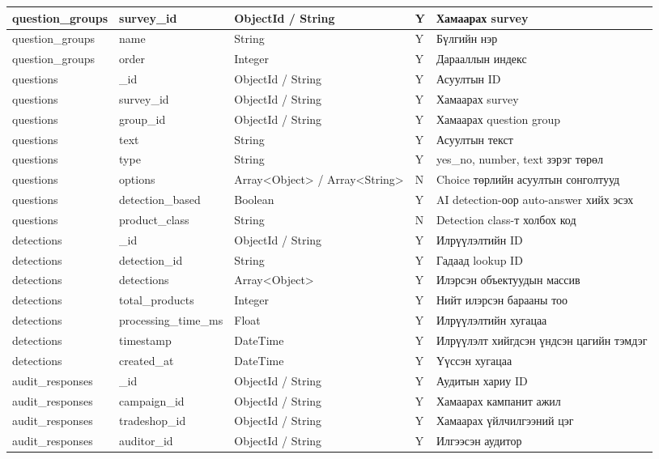 \begin{longtable}{|P{0.14}|P{0.22}|P{0.15}|P{0.06}|P{0.35}|}
\hline
question\_groups & survey\_id & ObjectId / String & Y & Хамаарах survey \\
\hline
question\_groups & name & String & Y & Бүлгийн нэр \\
\hline
question\_groups & order & Integer & Y & Дарааллын индекс \\
\hline
questions & \_id & ObjectId / String & Y & Асуултын ID \\
\hline
questions & survey\_id & ObjectId / String & Y & Хамаарах survey \\
\hline
questions & group\_id & ObjectId / String & Y & Хамаарах question group \\
\hline
questions & text & String & Y & Асуултын текст \\
\hline
questions & type & String & Y & yes\_no, number, text зэрэг төрөл \\
\hline
questions & options & Array<Object> / Array<String> & N & Choice төрлийн асуултын сонголтууд \\
\hline
questions & detection\_based & Boolean & Y & AI detection-оор auto-answer хийх эсэх \\
\hline
questions & product\_class & String & N & Detection class-т холбох код \\
\hline
detections & \_id & ObjectId / String & Y & Илрүүлэлтийн ID \\
\hline
detections & detection\_id & String & Y & Гадаад lookup ID \\
\hline
detections & detections & Array<Object> & Y & Илэрсэн объектуудын массив \\
\hline
detections & total\_products & Integer & Y & Нийт илэрсэн барааны тоо \\
\hline
detections & processing\_time\_ms & Float & Y & Илрүүлэлтийн хугацаа \\
\hline
detections & timestamp & DateTime & Y & Илрүүлэлт хийгдсэн үндсэн цагийн тэмдэг \\
\hline
detections & created\_at & DateTime & Y & Үүссэн хугацаа \\
\hline
audit\_responses & \_id & ObjectId / String & Y & Аудитын хариу ID \\
\hline
audit\_responses & campaign\_id & ObjectId / String & Y & Хамаарах кампанит ажил \\
\hline
audit\_responses & tradeshop\_id & ObjectId / String & Y & Хамаарах үйлчилгээний цэг \\
\hline
audit\_responses & auditor\_id & ObjectId / String & Y & Илгээсэн аудитор \\

\end{longtable}
